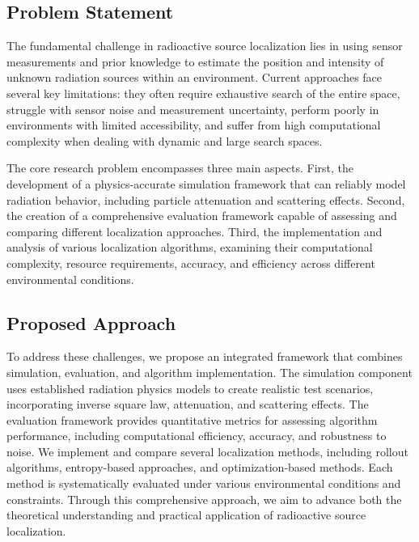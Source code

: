 \documentclass[../report.tex]{subfiles}
\begin{document}
    \subsection{Problem Statement}
    \label{sec:introduction:problem_statement}

    The fundamental challenge in radioactive source localization lies in using sensor measurements and prior knowledge to estimate the position and intensity of unknown radiation 
    sources within an environment. Current approaches face several key limitations: they often require exhaustive search of the entire space, struggle with sensor noise and measurement 
    uncertainty, perform poorly in environments with limited accessibility, and suffer from high computational complexity when dealing with dynamic and large search spaces.

    The core research problem encompasses three main aspects. First, the development of a physics-accurate simulation framework that can reliably model radiation behavior, including particle 
    attenuation and scattering effects. Second, the creation of a comprehensive evaluation framework capable of assessing and comparing different localization approaches. Third, the 
    implementation and analysis of various localization algorithms, examining their computational complexity, resource requirements, accuracy, and efficiency across different environmental conditions.
    \subsection{Proposed Approach}
    \label{sec:introduction:proposed_approach}

    To address these challenges, we propose an integrated framework that combines simulation, evaluation, and algorithm implementation. The simulation component uses established radiation physics models 
    to create realistic test scenarios, incorporating inverse square law, attenuation, and scattering effects. The evaluation framework provides quantitative metrics for assessing algorithm performance, 
    including computational efficiency, accuracy, and robustness to noise. We implement and compare several localization methods, including rollout algorithms, entropy-based approaches, and optimization-based methods. Each method is systematically evaluated under various environmental conditions and constraints. Through this comprehensive approach, we aim to advance both the theoretical understanding and 
    practical application of radioactive source localization.
\end{document}
